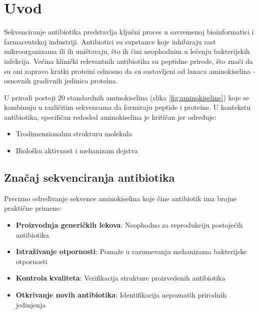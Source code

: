 \documentclass[12pt,oneside]{memoir}
\begin{document}

\frontmatter
\naslovna
\komisija
{}
\apstrakt
\tableofcontents*

\mainmatter

\chapter{Uvod}
Sekvenciranje antibiotika predstavlja ključni proces u savremenoj bioinformatici i farmaceutskoj industriji. Antibiotici su supstance koje inhibiraju rast mikroorganizama ili ih uništavaju, što ih čini neophodnim u lečenju bakterijskih infekcija. Većina klinički relevantnih antibiotika su peptidne prirode, što znači da su oni zapravo kratki proteini odnosno da su sastavljeni od lanaca aminokiselina - osnovnih gradivnih jedinica proteina.

U prirodi postoji 20 standardnih aminokiselina (slika \ref{fig:aminokiseline}) koje se kombinuju u različitim sekvencama da formiraju peptide i proteine. U kontekstu antibiotika, specifičan redosled aminokiselina je kritičan jer određuje:

\begin{itemize}
    \item Trodimenzionalnu strukturu molekula
    \item Biološku aktivnost i mehanizam dejstva
\end{itemize}

\section{Značaj sekvenciranja antibiotika}
Precizno određivanje sekvence aminokiselina koje čine antibiotik ima brojne praktične primene:

\begin{itemize}
    \item \textbf{Proizvodnja generičkih lekova}: Neophodno za reprodukciju postojećih antibiotika
    \item \textbf{Istraživanje otpornosti}: Pomaže u razumevanju mehanizama bakterijske otpornosti
    \item \textbf{Kontrola kvaliteta}: Verifikacija strukture proizvedenih antibiotika
    \item \textbf{Otkrivanje novih antibiotika}: Identifikacija nepoznatih prirodnih jedinjenja
\end{itemize}
\end{document}

